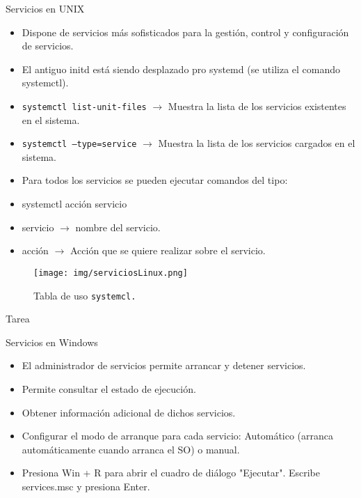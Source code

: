 \documentclass{beamer}
\begin{document}
\begin{frame}{Servicios en UNIX}
\begin{itemize}
\item Dispone de servicios más sofisticados para la gestión, control y
configuración de servicios.
\item El antiguo initd está siendo desplazado pro systemd (se utiliza el comando
systemctl).
\item \texttt{systemctl list-unit-files} $\to$ Muestra la lista de los servicios existentes en el sistema.
\item \texttt{systemctl --type=service} $\to$ Muestra la lista de los servicios cargados en el sistema.
\item Para todos los servicios se pueden ejecutar comandos del tipo:
\item systemctl acción servicio
\item servicio $\to$ nombre del servicio.
\item acción $\to$ Acción que se quiere realizar sobre el servicio.
\end{itemize}
\end{frame}

\begin{frame}
    \begin{figure}
        \centering
        \texttt{[image: img/serviciosLinux.png]} 
        \caption{Tabla de uso \texttt{systemcl.}}
    \end{figure}
\end{frame}


\begin{frame}{Tarea}

\end{frame}


\begin{frame}{Servicios en Windows}
    \begin{itemize}
        \item El administrador de servicios permite arrancar y detener servicios.
        \item Permite consultar el estado de ejecución.
        \item Obtener información adicional de dichos servicios.
        \item Configurar el modo de arranque para cada servicio: Automático (arranca automáticamente cuando arranca el SO) o manual.
        \item Presiona Win + R para abrir el cuadro de diálogo "Ejecutar". Escribe services.msc y presiona Enter.
    \end{itemize}
\end{frame}
\end{document}
